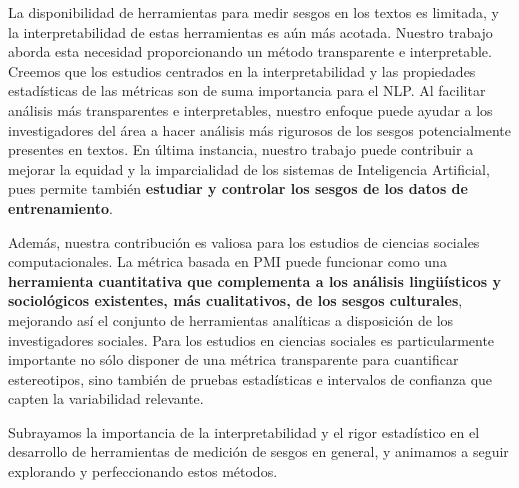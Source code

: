 La disponibilidad de herramientas para medir sesgos en los textos es limitada, y la interpretabilidad de estas herramientas es aún más acotada. Nuestro trabajo aborda esta necesidad proporcionando un método transparente e interpretable. Creemos que los estudios centrados en la interpretabilidad y las propiedades estadísticas de las métricas son de suma importancia para el NLP. Al facilitar análisis más transparentes e interpretables, nuestro enfoque puede ayudar a los investigadores del área a hacer análisis más rigurosos de los sesgos potencialmente presentes en textos. En última instancia, nuestro trabajo puede contribuir a mejorar la equidad y la imparcialidad de los sistemas de Inteligencia Artificial, pues permite también \textbf{estudiar y controlar los sesgos de los datos de entrenamiento}.

Además, nuestra contribución es valiosa para los estudios de ciencias sociales computacionales. La métrica basada en PMI puede funcionar como una \textbf{herramienta cuantitativa que complementa a los análisis lingüísticos y sociológicos existentes, más cualitativos, de los sesgos culturales}, mejorando así el conjunto de herramientas analíticas a disposición de los investigadores sociales. Para los estudios en ciencias sociales es particularmente importante no sólo disponer de una métrica transparente para cuantificar estereotipos, sino también de pruebas estadísticas e intervalos de confianza que capten la variabilidad relevante.

Subrayamos la importancia de la interpretabilidad y el rigor estadístico en el desarrollo de herramientas de medición de sesgos en general, y animamos a seguir explorando y perfeccionando estos métodos. 

